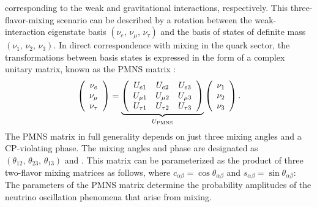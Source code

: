corresponding to the weak and gravitational interactions, respectively. 
This three-flavor-mixing
scenario can be described by a rotation between the weak-interaction
eigenstate basis $(\nu_e,\, \nu_\mu,\, \nu_\tau)$ and the basis of
states of definite mass $(\nu_1,\, \nu_2,\, \nu_3)$.  In direct
correspondence with mixing in the quark sector, the transformations
between basis states is expressed in the form of a complex unitary
matrix, known as the PMNS matrix :
\begin{equation}
\left(\begin{array}{ccc} \nu_e \\ \nu_\mu \\ \nu_\tau \end{array} \right)= 
\underbrace{
  \left(\begin{array}{ccc}
      U_{e 1} &  U_{e 2} & U_{e 3} \\ 
      U_{\mu1} &  U_{\mu2} & U_{\mu 3} \\ 
      U_{\tau 1} &  U_{\tau 2} & U_{\tau 3} 
    \end{array} \right)
}_{U_{\rm PMNS}} \left(\begin{array}{ccc} \nu_1 \\ \nu_2 \\ \nu_3 \end{array} \right).
\label{eqn:pmns0}
\end{equation}
The PMNS matrix in full generality depends on just three mixing angles
and a CP-violating phase.  The mixing angles and phase are designated
as $(\theta_{12},\, \theta_{23},\, \theta_{13})$ and
\deltacp.  %
This matrix can be parameterized as the product of three
two-flavor mixing matrices as follows, where $c_{\alpha \beta}=\cos \theta_{\alpha \beta}$ and $s_{\alpha
  \beta}=\sin \theta_{\alpha \beta}$:
%
%
The parameters of the PMNS
matrix determine the probability amplitudes of the neutrino
oscillation phenomena that arise from mixing. 

